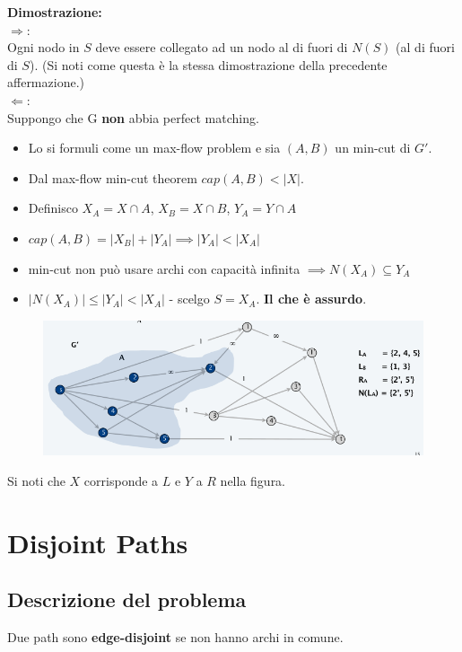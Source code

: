 \textbf{Dimostrazione:}\\
$\Rightarrow:$\\
Ogni nodo in $S$ deve essere
collegato ad un nodo al di fuori di $N(S)$ (al di fuori di $S$). (Si
noti come questa è la stessa dimostrazione della precedente
affermazione.)\\

$\Leftarrow:$\\
Suppongo che G \textbf{non} abbia perfect matching.
\begin{itemize}
    \item Lo si formuli come un max-flow problem e sia $(A,B)$ un min-cut di $G'$.
    \item Dal max-flow min-cut theorem $cap(A,B) < |X|$.
    \item Definisco $X_A = X \cap A$, $X_B = X \cap B$, $Y_A = Y \cap A$
    \item $cap(A,B) = |X_B| + |Y_A| \implies |Y_A| < |X_A|$
    \item min-cut non può usare archi con capacità infinita $\implies N(X_A) \subseteq Y_A$
    \item $|N(X_A)| \le |Y_A| < |X_A|$ - scelgo $S = X_A$. \textbf{Il che è assurdo}.
\end{itemize}

\begin{figure}[H]
    \centering
    \includegraphics[width = 12 cm]{Network_flow/imgs/bipartite3.png}
\end{figure}

Si noti che $X$ corrisponde a $L$ e $Y$ a $R$ nella figura.

\section{Disjoint Paths}

\subsection{Descrizione del problema}

Due path sono \textbf{edge-disjoint} se non hanno archi in comune.\\

